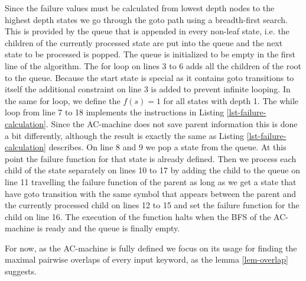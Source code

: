 \documentclass[english,twoside,censored,csm,algorithms-track-2020]{HYthesisML}
\newcommand*\circled[1]{\tikz[baseline=(char.base)]{
    \node[shape=circle,draw,inner sep=2pt] (char) {#1};}}
\theoremstyle{plain}
\theoremstyle{definition}
\begin{document}
  Since the failure values must be calculated from lowest depth nodes to the highest depth states
  we go through the goto path using a breadth-first search. This is provided by the queue that is
  appended in every non-leaf state, i.e. the children of the currently processed state are put into the
  queue and the next state to be processed is popped. The queue is initialized to be empty in the first
  line of the algorithm. The for loop on lines 3 to 6 adds all the children of the root to the queue.
  Because the start state is special as it contains goto transitions to itself the additional constraint
  on line 3 is added to prevent infinite looping. In the same for loop, we define the
  $f(s)=1$ for all states with depth 1. The while loop from line 7 to 18 implements the instructions
  in Listing \ref{lst-failure-calculation}. Since the AC-machine does not save parent information
  this is done a bit differently, although the result is exactly the same as Listing
  \ref{lst-failure-calculation} describes. On line 8 and 9 we pop a
  state from the queue. At this point the failure function for that state is already defined. Then we
  process each child of the state separately on lines 10 to 17 by \circled{1} adding the child to the
  queue  on line 11  \circled{2} travelling the failure function of the parent as long as we get a state
  that have goto   transition with the same symbol that appears between the parent and the currently
  processed child on lines 12 to 15 and  \circled{3} set the failure function for the child on line 16.
  The execution of the function halts when the BFS of the  AC-machine is ready and the queue is
  finally empty.

  For now, as the AC-machine is fully defined we focus on its usage for finding the maximal pairwise
  overlaps of every input keyword, as the lemma \ref{lem-overlap} suggests.
\end{document}
